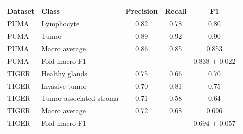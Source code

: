 \begin{tabular}{llccc}
\toprule
Dataset & Class & Precision & Recall & F1 \\
\midrule
PUMA & Lymphocyte & 0.82 & 0.78 & 0.80 \\
PUMA & Tumor & 0.89 & 0.92 & 0.90 \\
PUMA & Macro average & 0.86 & 0.85 & 0.853 \\
PUMA & Fold macro-F1 & -- & -- & 0.838 $\pm$ 0.022 \\
TIGER & Healthy glands & 0.75 & 0.66 & 0.70 \\
TIGER & Invasive tumor & 0.70 & 0.81 & 0.75 \\
TIGER & Tumor-associated stroma & 0.71 & 0.58 & 0.64 \\
TIGER & Macro average & 0.72 & 0.68 & 0.696 \\
TIGER & Fold macro-F1 & -- & -- & 0.694 $\pm$ 0.057 \\
\bottomrule
\end{tabular}
